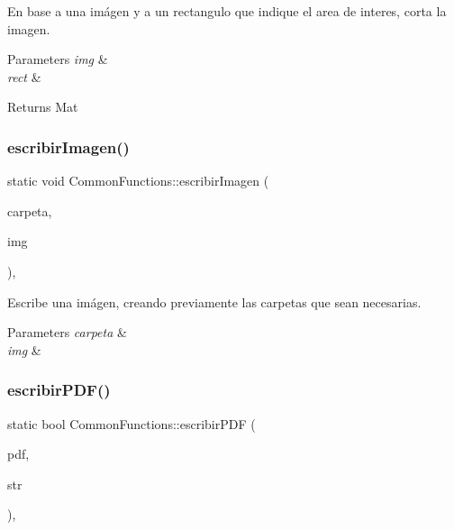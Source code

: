 En base a una imágen y a un rectangulo que indique el area de interes, corta la imagen. 


\begin{DoxyParams}{Parameters}
{\em img} & \\
\hline
{\em rect} & \\
\hline
\end{DoxyParams}
\begin{DoxyReturn}{Returns}
Mat 
\end{DoxyReturn}
\mbox{\label{classCommonFunctions_a1cbb74aeab1ac5dc96ba4871d0f07792}} 
\subsubsection{\texorpdfstring{escribir\+Imagen()}{escribirImagen()}}
{\footnotesize\ttfamily static void Common\+Functions\+::escribir\+Imagen (\begin{DoxyParamCaption}\item[{string}]{carpeta,  }\item[{Mat}]{img }\end{DoxyParamCaption})\hspace{0.3cm}{\ttfamily [inline]}, {\ttfamily [static]}}



Escribe una imágen, creando previamente las carpetas que sean necesarias. 


\begin{DoxyParams}{Parameters}
{\em carpeta} & \\
\hline
{\em img} & \\
\hline
\end{DoxyParams}
\mbox{\label{classCommonFunctions_a188e7c8fcb797856482ecfd4010c62a9}} 
\subsubsection{\texorpdfstring{escribir\+P\+D\+F()}{escribirPDF()}}
{\footnotesize\ttfamily static bool Common\+Functions\+::escribir\+P\+DF (\begin{DoxyParamCaption}\item[{H\+P\+D\+F\+\_\+\+Doc}]{pdf,  }\item[{string}]{str }\end{DoxyParamCaption})\hspace{0.3cm}{\ttfamily [inline]}, {\ttfamily [static]}}



